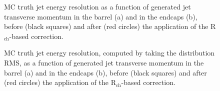 \documentclass{cmspaper}
\begin{document}
\begin{figure}[tb]
\centering
{}
\caption{MC truth jet energy resolution as a function of generated jet transverse momentum in the barrel (a) and in the endcaps (b), before (black squares) and after (red circles) the application of the R$_{\mathrm{ch}}$-based correction. \label{fig:resolution}}
\end{figure}

\begin{figure}[tb]
\centering
{}
\caption{MC truth jet energy resolution, computed by taking the distribution RMS, as a function of generated jet transverse momentum in the barrel (a) and in the endcaps (b), before (black squares) and after (red circles) the application of the R$_{\mathrm{ch}}$-based correction. \label{fig:resolution_RMS}}
\end{figure}
\end{document}
